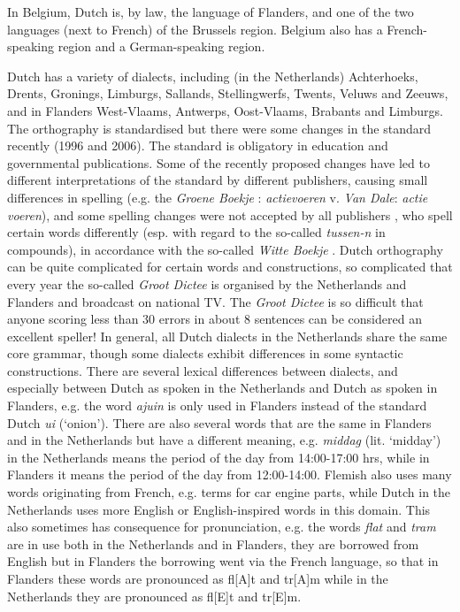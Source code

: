 \begin{multicols}{2}
    In Belgium, Dutch is, by law, the language of Flanders, and one of the two languages (next to French) of the Brussels region.  Belgium also has a French-speaking region and a German-speaking region.

    Dutch has a variety of dialects, including (in the Netherlands) Achterhoeks, Drents, Gronings, Limburgs, Sallands, Stellingwerfs, Twents, Veluws and Zeeuws, and in Flanders West-Vlaams, Antwerps, Oost-Vlaams, Brabants and Limburgs. The orthography is standardised but there were some changes in the standard recently (1996 and 2006).  The standard is obligatory in education and governmental publications. Some of the recently proposed changes have led to different interpretations of the standard by different publishers, causing small differences in spelling (e.g.  the \textit{Groene Boekje} \cite{GroeneBoekje}: \textit{actievoeren} v. \textit{Van Dale}: \textit{actie voeren}), and some spelling changes were not accepted by all publishers \cite{Wittespellers}, who spell certain words differently (esp. with regard to the so-called \textit{tussen-n} in compounds), in accordance with the so-called \textit{Witte Boekje} \cite{Wittespelling}.  Dutch orthography can be quite complicated for certain words and constructions, so complicated that every year the so-called \textit{Groot Dictee} \cite{Grootdictee} is organised by the Netherlands and Flanders and broadcast on national TV. The \textit{Groot Dictee} is so difficult that anyone scoring less than 30 errors in about 8 sentences can be considered an excellent speller! In general, all Dutch dialects in the Netherlands share the same core grammar, though some dialects exhibit differences in some syntactic constructions. There are several  lexical differences between dialects, and especially between Dutch as spoken in the Netherlands and Dutch as spoken in Flanders, e.g. the word \textit{ajuin} is only used in Flanders instead of the standard Dutch \textit{ui} (`onion').  There are also several words that are the same in Flanders and in the Netherlands but have a different meaning, e.g. \textit{middag} (lit. `midday') in the Netherlands means the period of the day from 14:00-17:00 hrs, while in Flanders it means the period of the day from 12:00-14:00. Flemish also uses many words originating from French, e.g. terms for car engine parts, while Dutch in the Netherlands uses more English or English-inspired words in this domain. This also sometimes has consequence for pronunciation, e.g. the words \textit{flat} and \textit{tram} are in use both in the Netherlands and in Flanders, they are borrowed from English but in Flanders the borrowing went via the French language, so that in Flanders these words are pronounced as fl[A]t and tr[A]m while in the Netherlands they are pronounced as fl[E]t and tr[E]m.


\end{multicols}
